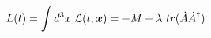\begin{equation}
L(t)=\int d^3x~{\cal{L}}(t,\mbox{\boldmath$x$})= -M+\lambda~tr({\dot{A}} {\dot{A}}^\dag)
\end{equation}


